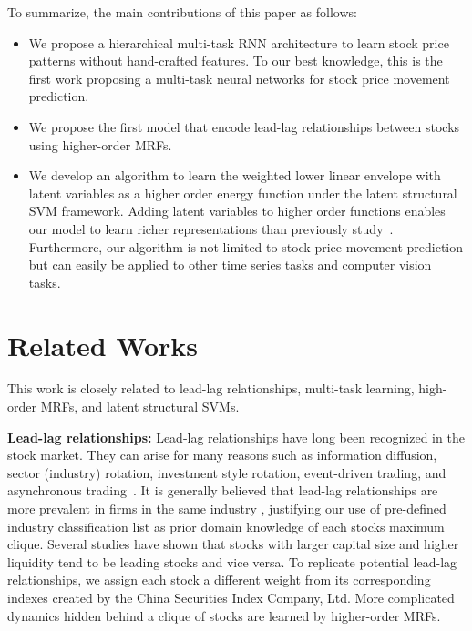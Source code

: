 To summarize, the main contributions of this paper as follows: 
\begin{itemize}
\item We propose a hierarchical multi-task RNN architecture to
  learn stock price patterns without hand-crafted features. To
  our best knowledge, this is the first work proposing a
  multi-task neural networks for stock price movement prediction.
\item We propose the first model that encode lead-lag
  relationships between stocks using higher-order MRFs.
\item We develop an algorithm to learn the weighted lower linear
  envelope with latent variables as a higher order energy function
  under the latent structural SVM framework. Adding latent variables
  to higher order functions enables our model to learn
  richer representations than previously study~\cite{gouldlearning}.
  Furthermore, our algorithm is not limited to
  stock price movement prediction but can easily be applied
  to other time series tasks and computer vision tasks.
\end{itemize}

\section{Related Works}
\label{sec:background}
This work is closely related to lead-lag relationships, multi-task learning, high-order MRFs, and latent structural SVMs.

\textbf{Lead-lag relationships:} Lead-lag relationships have long been recognized in the stock market. They can arise for many reasons such as information diffusion, sector (industry) rotation, investment style rotation, event-driven trading, and asynchronous trading~\cite{lo1990contrarian,chordia2000trading,conrad1988time,hameed1997time}. It is generally believed that lead-lag relationships are more prevalent in firms in the same industry \cite{hou2007industry}, justifying our use of pre-defined industry classification list \cite{ths} as prior domain knowledge of each stock\textquotesingle s maximum clique. Several studies \cite{brennan1993investment,hou2007industry,badrinath1995shepherds,mcqueen1996delayed}
have shown that stocks with larger capital size and higher liquidity tend to be leading stocks and vice versa.
To replicate potential lead-lag relationships, we assign each stock a different weight from its corresponding indexes created by the China Securities Index Company, Ltd. More complicated dynamics hidden behind a clique
of stocks are learned by higher-order MRFs.

